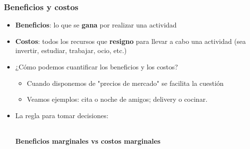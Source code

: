 \documentclass{beamer}
\begin{document}
\begin{frame}
\frametitle{Beneficios y costos}
\begin{itemize}
    \item \textbf{Beneficios}: lo que se \textbf{gana} por realizar una actividad \vspace{2mm}
    \item \textbf{Costos}: todos los recursos que \textbf{resigno} para llevar a cabo una actividad (sea invertir, estudiar, trabajar, ocio, etc.) \vspace{2mm}
    \item ¿Cómo podemos cuantificar los beneficios y los costos? 
    \begin{itemize}
    \item Cuando disponemos de "precios de mercado" se facilita la cuestión
    \item Veamos ejemplos: cita o noche de amigos; delivery o cocinar.
    \end{itemize}
    \item La regla para tomar decisiones:
    \begin{boxB}
     \\ \vspace{2mm}
    \textbf{Beneficios marginales vs costos marginales} \centering 
    \end{boxB}
\end{itemize} 
\end{frame}
\end{document}
